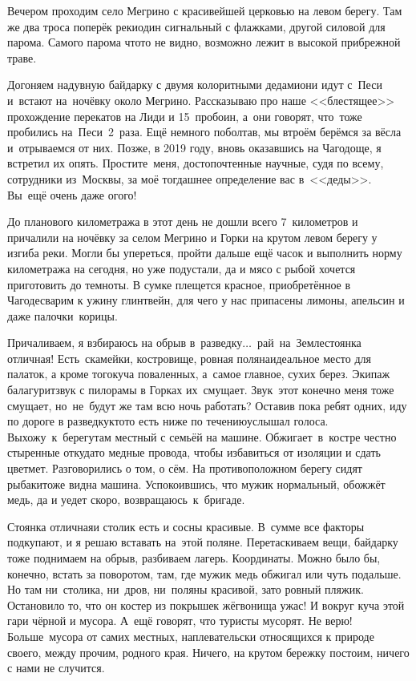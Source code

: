 Вечером проходим село Мегрино с красивейшей церковью на левом берегу. Там же два троса поперёк реки\mdash один сигнальный с флажками, другой силовой для парома. Самого парома что\sdash то не видно, возможно лежит в высокой прибрежной траве. 

Догоняем надувную байдарку с двумя колоритными дедами\mdash они идут с~Песи и~встают на~ночёвку около Мегрино. Рассказываю про наше <<блестящее>> прохождение перекатов на Лиди и 15~пробоин, а~они говорят, что~тоже пробились на~Песи~2~раза. Ещё немного поболтав, мы втроём берёмся за вёсла и~отрываемся от них. Позже, в 2019 году, вновь оказавшись на Чагодоще, я встретил их опять. Простите~меня, достопочтенные научные, судя по всему, сотрудники из~Москвы, за моё тогдашнее определение вас в~<<деды>>. Вы~ещё очень даже ого\sdash го!

До планового километража в этот день не дошли всего 7~километров и причалили на ночёвку за селом Мегрино и Горки на крутом левом берегу у изгиба реки. Могли бы упереться, пройти дальше ещё часок и выполнить норму километража на сегодня, но уже подустали, да и мясо с рыбой хочется приготовить до темноты. В сумке плещется красное, приобретённое в Чагоде\mdash сварим к ужину глинтвейн, для чего у нас припасены лимоны, апельсин и даже палочки~корицы. 

Причаливаем, я взбираюсь на обрыв в~разведку$\ldots$~рай~на~Земле\mdash стоянка отличная! Есть~скамейки, костровище, ровная поляна\mdash идеальное место для палаток, а кроме того\mdash куча поваленных, а~самое главное, сухих берез. Экипаж балагурит\mdash звук с пилорамы в Горках их~смущает. Звук~этот конечно меня тоже смущает, но~не~будут же там всю ночь работать? Оставив пока ребят одних, иду по дороге в разведку\mdash кто\sdash то есть ниже по течению\mdash услышал голоса. Выхожу~к~берегу\mdash там местный с семьёй на машине. Обжигает~в~костре честно стыренные откуда\sdash то медные провода, чтобы избавиться от изоляции и сдать цветмет. Разговорились о том, о сём. На противоположном берегу сидят рыбаки\mdash тоже видна машина. Успокоившись, что мужик нормальный, обожжёт медь, да и уедет скоро, возвращаюсь~к~бригаде. 

Стоянка отличная\mdash и столик есть и сосны красивые. В~сумме все факторы подкупают, и я решаю вставать на~этой поляне. Перетаскиваем вещи, байдарку тоже поднимаем на обрыв, разбиваем лагерь. Координаты\mdash \CoordsChagodoschaMegrino. Можно было бы, конечно, встать за поворотом, там, где мужик медь обжигал или чуть подальше. Но там ни~столика, ни~дров, ни~поляны красивой, зато ровный пляжик. Остановило то, что он костер из покрышек жёг\mdash вонища ужас! И вокруг куча этой гари чёрной и мусора. А~ещё говорят, что туристы мусорят. Не верю! Больше~мусора от самих местных, наплевательски относящихся к природе своего, между прочим, родного края. Ничего, на крутом бережку постоим, ничего с нами не случится.

